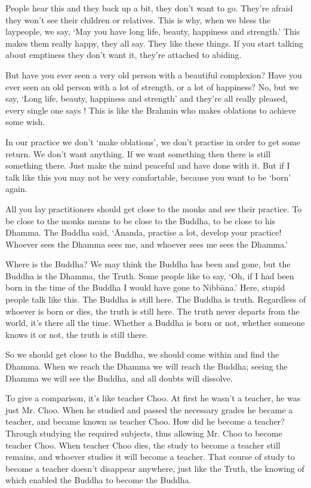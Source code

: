 People hear this and they back up a bit, they don't want to go. They're afraid they won't see their children or relatives. This is why, when we bless the laypeople, we say, `May you have long life, beauty, happiness and strength.' This makes them really happy,  they all say. They like these things. If you start talking about emptiness they don't want it, they're attached to abiding.

But have you ever seen a very old person with a beautiful complexion? Have you ever seen an old person with a lot of strength, or a lot of happiness? No, but we say, `Long life, beauty, happiness and strength' and they're all really pleased, every single one says ! This is like the Brahmin who makes oblations to achieve some wish.

In our practice we don't `make oblations', we don't practise in order to get some return. We don't want anything. If we want something then there is still something there. Just make the mind peaceful and have done with it. But if I talk like this you may not be very comfortable, because you want to be `born' again.

All you lay practitioners should get close to the monks and see their practice. To be close to the monks means to be close to the Buddha, to be close to his Dhamma. The Buddha said, `\=Ananda, practise a lot, develop your practice! Whoever sees the Dhamma sees me, and whoever sees me sees the Dhamma.'

Where is the Buddha? We may think the Buddha has been and gone, but the Buddha is the Dhamma, the Truth. Some people like to say, `Oh, if I had been born in the time of the Buddha I would have gone to Nibb\=ana.' Here, stupid people talk like this. The Buddha is still here. The Buddha is truth. Regardless of whoever is born or dies, the truth is still here. The truth never departs from the world, it's there all the time. Whether a Buddha is born or not, whether someone knows it or not, the truth is still there.

So we should get close to the Buddha, we should come within and find the Dhamma. When we reach the Dhamma we will reach the Buddha; seeing the Dhamma we will see the Buddha, and all doubts will dissolve.

To give a comparison, it's like teacher Choo. At first he wasn't a teacher, he was just Mr. Choo. When he studied and passed the necessary grades he became a teacher, and became known as teacher Choo. How did he become a teacher? Through studying the required subjects, thus allowing Mr. Choo to become teacher Choo. When teacher Choo dies, the study to become a teacher still remains, and whoever studies it will become a teacher. That course of study to become a teacher doesn't disappear anywhere, just like the Truth, the knowing of which enabled the Buddha to become the Buddha.

